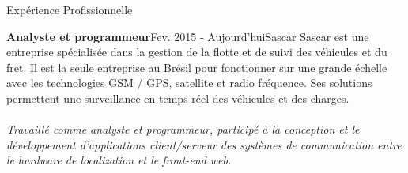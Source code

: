 \documentclass{resume}
\begin{document}
  \begin{rSection}{Expérience Profissionnelle}

    \begin{rSubsection}{\fontsize{12}{14}\selectfont \bf Analyste et programmeur}{\fontsize{12}{14}\selectfont Fev. 2015 - Aujourd'hui}{\fontsize{12}{14}\selectfont Sascar}{}
    Sascar est une entreprise spécialisée dans la gestion de la flotte et de suivi des véhicules et du fret. Il est la seule entreprise au Brésil pour fonctionner sur une grande échelle avec les technologies GSM / GPS, satellite et radio fréquence. Ses solutions permettent une surveillance en temps réel des véhicules et des charges.\\\\
    \textit{Travaillé comme analyste et programmeur, participé à la conception et le développement d’applications client/serveur des systèmes de communication entre le hardware de localization et le front-end web.}

    \end{rSubsection}


\end{rSection}
\end{document}
